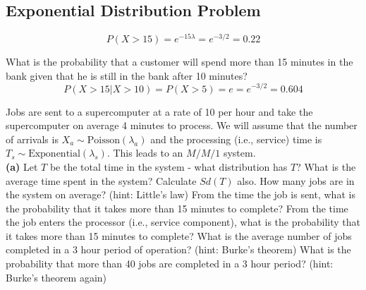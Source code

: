 ﻿



\subsection{Exponential Distribution Problem}


\[
P (X > 15) = e ^{-15\lambda}
= e ^{-3 / 2}
= 0.22
\]


What is the probability that a customer will spend more than 15 minutes in the bank given that he is still in the bank after 10 minutes?
\[
P (X > 15|X > 10) = P (X > 5) = e
= e ^{-3 / 2}
= 0.604
\]


\item 
Jobs are sent to a supercomputer at a rate of 10 per hour and take the supercomputer on average 4 minutes to process. We will assume that the number of arrivals is $X_a \sim \text{Poisson}(\lambda_a)$ and the processing (i.e., service) time is $T_s \sim \text{Exponential}(\lambda_s)$. This leads to an $M/M/1$ system.\\[-0.2cm]

{\bf(a)} Let $T$ be the total time in the system - what distribution has $T$?  What is the average time spent in the system? Calculate $Sd(T)$ also.  How many jobs are in the system on average? (hint: Little's law)   From the time the job is sent, what is the probability that it takes more than 15 minutes to complete?   From the time the job enters the processor (i.e., service component), what is the probability that it takes more than 15 minutes to complete?  What is the average number of jobs completed in a 3 hour period of operation? (hint: Burke's theorem)  What is the probability that more than 40 jobs are completed in a 3 hour period? (hint: Burke's theorem again)



